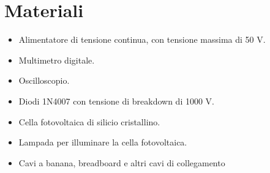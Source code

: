 \section*{Materiali}

\begin{itemize}
    \setlength{\itemsep}{0.5pt}
    \item{Alimentatore di tensione continua, con tensione massima di 50 V.}
    \item{Multimetro digitale.}
    \item{Oscilloscopio.}
    \item{Diodi 1N4007 con tensione di breakdown di 1000 V.}
    \item{Cella fotovoltaica di silicio cristallino.}
    \item{Lampada per illuminare la cella fotovoltaica.}
    \item{Cavi a banana, breadboard e altri cavi di collegamento}
\end{itemize}
